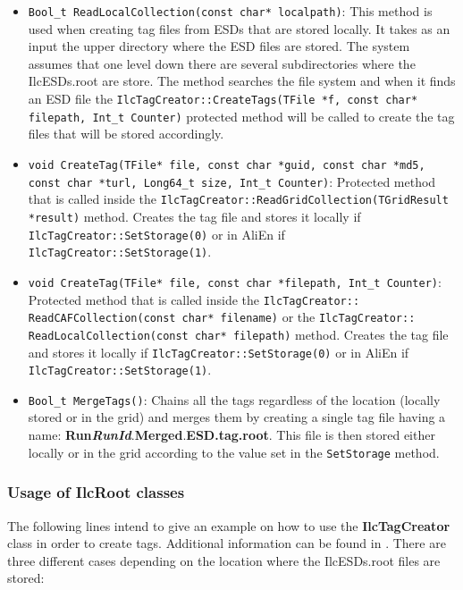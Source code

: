 \documentclass[12pt,a4paper,twoside]{article}
\newcommand{\method}[1]{\texttt{#1}\xspace}
\begin{document}
{\begin{itemize}
\item \method{Bool\_t ReadLocalCollection(const char* localpath)}:
  This method is used when creating tag files from ESDs that are
  stored locally. It takes as an input the upper directory where the
  ESD files are stored. The system assumes that one level down there
  are several subdirectories where the IlcESDs.root are store. The
  method searches the file system and when it finds an ESD file the
  \method{IlcTagCreator::CreateTags(TFile *f, const char* filepath, Int\_t Counter)}
 protected method will be called to create the tag
  files that will be stored accordingly.

\item \method{void CreateTag(TFile* file, const char *guid, const char *md5, const char *turl, Long64\_t size, Int\_t Counter)}:
 Protected method that is called inside the
 \method{IlcTagCreator::ReadGridCollection(TGridResult *result)}
 method. Creates the tag file and stores it locally if \method{IlcTagCreator::SetStorage(0)}
  or in AliEn if \method{IlcTagCreator::SetStorage(1)}.

\item \method{void CreateTag(TFile* file, const char *filepath, Int\_t Counter)}:
 Protected method that is called inside the
  \method{IlcTagCreator:: ReadCAFCollection(const char* filename)} or
  the \method{IlcTagCreator:: ReadLocalCollection(const char* filepath)}
 method. Creates the tag file and stores it locally if
  \method{IlcTagCreator::SetStorage(0)} or in AliEn if
  \method{IlcTagCreator::SetStorage(1)}.

\item \method{Bool\_t MergeTags()}: Chains all the tags regardless of
  the location (locally stored or in the grid) and merges them by
  creating a single tag file having a name:
  \textbf{Run}\textbf{\textit{RunId}}.\textbf{Merged}.\textbf{ESD.tag.root}.
  This file is then stored either locally or in the grid according to
  the value set in the \method{SetStorage} method.



\end{itemize}

\subsubsection{Usage of IlcRoot classes}

The following lines intend to give an example on how to use the
\textbf{IlcTagCreator} class in order to create tags. Additional
information can be found in \cite{EventTagWeb}. There are three
different cases depending on the location where the IlcESDs.root files
are stored:


}
\end{document}

